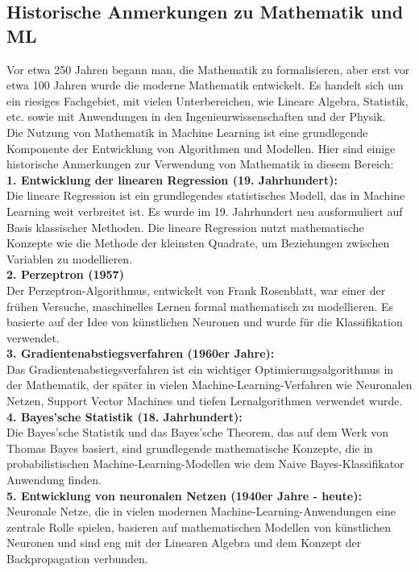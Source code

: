\documentclass[12pt]{article}
\begin{document}
\subsection{Historische Anmerkungen zu Mathematik und ML}
%
Vor etwa 250 Jahren begann man, die Mathematik zu formalisieren, aber erst vor etwa 100 Jahren wurde die moderne Mathematik entwickelt. Es handelt sich um ein riesiges Fachgebiet, mit vielen Unterbereichen, wie Lineare Algebra, Statistik, etc. sowie mit Anwendungen in den Ingenieurwissenschaften und der Physik.\\[0.2cm]
Die Nutzung von Mathematik in Machine Learning ist eine grundlegende Komponente der Entwicklung von Algorithmen und Modellen. Hier sind einige historische Anmerkungen zur Verwendung von Mathematik in diesem Bereich:\\[0.2cm]
\textbf{1. Entwicklung der linearen Regression (19. Jahrhundert):} \\
Die lineare Regression ist ein grundlegendes statistisches Modell, das in Machine Learning weit verbreitet ist. Es wurde im 19. Jahrhundert neu ausformuliert auf Basis klassischer Methoden. Die lineare Regression  nutzt mathematische Konzepte wie die Methode der kleinsten Quadrate, um Beziehungen zwischen Variablen zu modellieren.\\[0.2cm]
\textbf{2. Perzeptron (1957)}\\
Der Perzeptron-Algorithmus, entwickelt von Frank Rosenblatt, war einer der frühen Versuche, maschinelles Lernen formal mathematisch zu modellieren. Es basierte auf der Idee von künstlichen Neuronen und wurde für die Klassifikation verwendet.\\[0.2cm]
\textbf{3. Gradientenabstiegsverfahren (1960er Jahre):} \\
Das Gradientenabstiegsverfahren ist ein wichtiger Optimierungsalgorithmus in der Mathematik, der später in vielen Machine-Learning-Verfahren wie Neuronalen Netzen, Support Vector Machines und tiefen Lernalgorithmen verwendet wurde.\\[0.2cm]
\textbf{4. Bayes'sche Statistik (18. Jahrhundert):}\\
Die Bayes'sche Statistik und das Bayes'sche Theorem, das auf dem Werk von Thomas Bayes basiert, sind grundlegende mathematische Konzepte, die in probabilistischen Machine-Learning-Modellen wie dem Naive Bayes-Klassifikator Anwendung finden.\\[0.2cm]
\textbf{5. Entwicklung von neuronalen Netzen (1940er Jahre - heute):}\\
Neuronale Netze, die in vielen modernen Machine-Learning-Anwendungen eine zentrale Rolle spielen, basieren auf mathematischen Modellen von künstlichen Neuronen und sind eng mit der Linearen Algebra und dem Konzept der Backpropagation  verbunden.\\[0.2cm]
\end{document}
